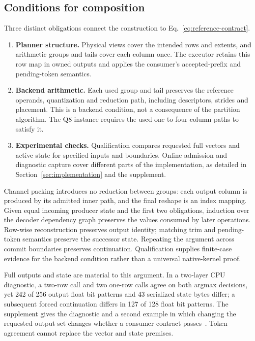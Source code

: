\subsection{Conditions for composition}
Three distinct obligations connect the construction to Eq.~\ref{eq:reference-contract}.
\begin{enumerate}
 \item \textbf{Planner structure.} Physical views cover the intended rows and extents, and arithmetic groups and tails cover each column once. The executor retains this row map in owned outputs and applies the consumer's accepted-prefix and pending-token semantics.
 \item \textbf{Backend arithmetic.} Each used group and tail preserves the reference operands, quantization and reduction path, including descriptors, strides and placement. This is a backend condition, not a consequence of the partition algorithm. The Q8 instance requires the used one-to-four-column paths to satisfy it.
 \item \textbf{Experimental checks.} Qualification compares requested full vectors and active state for specified inputs and boundaries. Online admission and diagnostic capture cover different parts of the implementation, as detailed in Section~\ref{sec:implementation} and the supplement.
\end{enumerate}
Channel packing introduces no reduction between groups: each output column is produced by its admitted inner path, and the final reshape is an index mapping. Given equal incoming producer state and the first two obligations, induction over the decoder dependency graph preserves the values consumed by later operations. Row-wise reconstruction preserves output identity; matching trim and pending-token semantics preserve the successor state. Repeating the argument across commit boundaries preserves continuation. Qualification supplies finite-case evidence for the backend condition rather than a universal native-kernel proof.

Full outputs and state are material to this argument. In a two-layer CPU diagnostic, a two-row call and two one-row calls agree on both argmax decisions, yet 242 of 256 output float bit patterns and 43 serialized state bytes differ; a subsequent forced continuation differs in 127 of 128 float bit patterns. The supplement gives the diagnostic and a second example in which changing the requested output set changes whether a consumer contract passes~\cite{records}. Token agreement cannot replace the vector and state premises.


